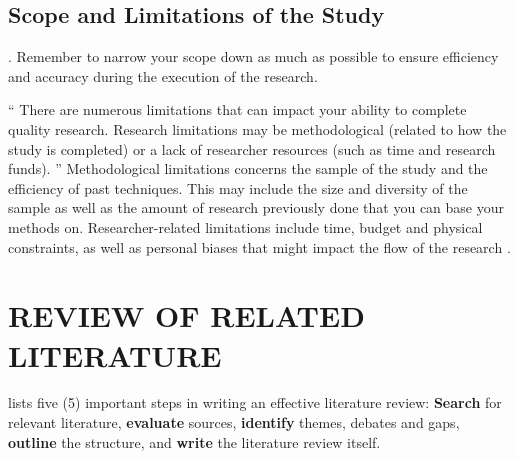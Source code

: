 \documentclass{strrespaper-trad}
\begin{document}
		\section{Scope and Limitations of the Study}
			. Remember to narrow your scope down as much as possible to ensure efficiency and accuracy during the execution of the research.

			\enquote{%
				There are numerous limitations that can impact your ability to complete quality research.
				Research limitations may be methodological (related to how the study is completed) or a lack of researcher resources (such as time and research funds).%
			}
			Methodological limitations concerns the sample of the study and the efficiency of past techniques. This may include the size and diversity of the sample as well as the amount of research previously done that you can base your methods on.
			Researcher-related limitations include time, budget and physical constraints, as well as personal biases that might impact the flow of the research \autocite{askmediagroupWhatAreScope2020}.


	\chapter{REVIEW OF RELATED LITERATURE}
		\textcite{mccombesLiteratureReviewComplete2019} lists five (5) important steps in writing an effective literature review: \textbf{Search} for relevant literature, \textbf{evaluate} sources, \textbf{identify} themes, debates and gaps, \textbf{outline} the structure, and \textbf{write} the literature review itself.
\end{document}
